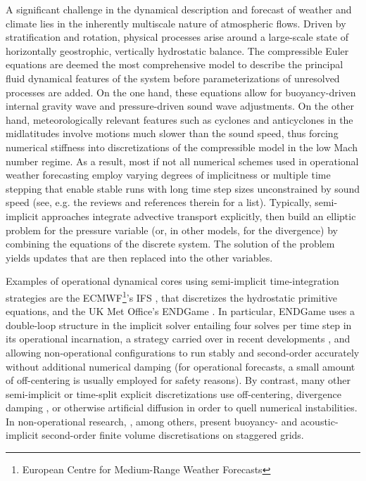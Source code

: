 \documentclass{ametsoc}
\theoremstyle{definition}
\begin{document}
A significant challenge in the dynamical description and forecast of weather and climate lies in the inherently multiscale nature of atmospheric flows. Driven by stratification and rotation, physical processes arise around a large-scale state of horizontally geostrophic, vertically hydrostatic balance. The compressible Euler equations are deemed the most comprehensive model to describe the principal fluid dynamical features of the system before parameterizations of unresolved processes are added. On the one hand, these equations allow for buoyancy-driven internal gravity wave and pressure-driven sound wave adjustments.  On the other hand, meteorologically relevant features such as cyclones and anticyclones in the midlatitudes involve motions much slower than the sound speed, thus forcing numerical stiffness into discretizations of the compressible model in the low Mach number regime. As a result, most if not all numerical schemes used in operational weather forecasting employ varying degrees of implicitness or multiple time stepping that enable stable runs with long time step sizes unconstrained by sound speed (see, e.g. the reviews \cite{MarrasEtAl2016, MengaldoEtAl2018} and references therein for a list). Typically, semi-implicit approaches integrate advective transport explicitly, then build an elliptic problem for the pressure variable (or, in other models, for the divergence) by combining the equations of the discrete system. The solution of the problem yields updates that are then replaced into the other variables. 

Examples of operational dynamical cores using semi-implicit time-integration strategies are the ECMWF\footnote{European Centre for Medium-Range Weather Forecasts}'s IFS \citep{TempertonEtAl2001, Hortal2002}, that discretizes the hydrostatic primitive equations, and the UK Met Office's ENDGame \citep{WoodEtAl2013, BenacchioWood2016}. In particular, ENDGame  uses a double-loop structure in the implicit solver entailing four solves per time step in its operational incarnation, a strategy carried over in recent developments \citep{MelvinEtAl2018}, and allowing non-operational configurations to run stably and second-order accurately without additional numerical damping (for operational forecasts, a small amount of off-centering is usually employed for safety reasons). By contrast, many other semi-implicit or time-split explicit discretizations use off-centering, divergence damping \citep{BryanFritsch2002}, or otherwise artificial diffusion in order to quell numerical instabilities. In non-operational research, \cite{DumbserEtAl2018}, among others, present buoyancy- and acoustic-implicit second-order finite volume discretisations on staggered grids.
\end{document}
